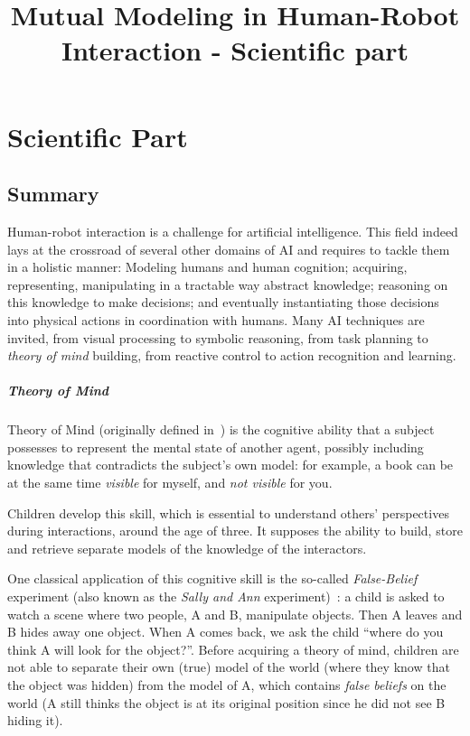 \documentclass{report}
\begin{document}
\title{Mutual Modeling in Human-Robot Interaction - Scientific part}

\chapter{Scientific Part}
\section{Summary}

Human-robot interaction is a challenge for artificial intelligence. This field
indeed lays at the crossroad of several other domains of AI and requires to
tackle them in a holistic manner: Modeling humans and human cognition;
acquiring, representing, manipulating in a tractable way abstract knowledge;
reasoning on this knowledge to make decisions; and eventually instantiating
those decisions into physical actions in coordination with humans. Many AI
techniques are invited, from visual processing to symbolic reasoning, from task
planning to \emph{theory of mind} building, from reactive control to action
recognition and learning.

\paragraph{Theory of Mind}

Theory of Mind (originally defined in~\cite{premack1978does}) is the cognitive
ability that a subject possesses to represent the mental state of another
agent, possibly including knowledge that contradicts the subject's own model: for
example, a book can be at the same time \emph{visible} for myself, and \emph{not
visible} for you.

Children develop this skill, which is essential to understand others'
perspectives during interactions, around the age of three. It supposes the
ability to build, store and retrieve separate models of the knowledge of the
interactors.

One classical application of this cognitive skill is the so-called
\emph{False-Belief} experiment (also known as the \emph{Sally and Ann}
experiment)~\cite{Leslie2000}: a child is asked to watch a scene where two
people, A and B, manipulate objects. Then A leaves and B hides away one
object. When A comes back, we ask the child ``where do you think A will
look for the object?''. Before acquiring a theory of mind, children are not
able to separate their own (true) model of the world (where they know that
the object was hidden) from the model of A, which contains \emph{false
beliefs} on the world (A still thinks the object is at its original
position since he did not see B hiding it).
\end{document}
